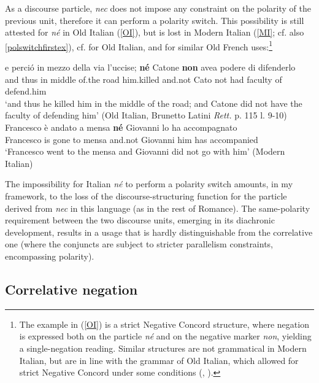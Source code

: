 \documentclass[output=paper,modfonts,nonflat,citecolor=brown,
showindex
]{langsci/langscibook}
\begin{document}
\noindent As a discourse particle, {\em{nec}} does not impose any constraint on the polarity of the previous unit, therefore it can perform a polarity switch. This possibility is still attested for {\em{n\'e}} in Old Italian (\ref{OI}), but is lost in Modern Italian (\ref{MI}; cf. also \ref{polswitchfirstex}), cf. \citet{Zanuttini10} for Old Italian, and \citet[]{Doetjes05} for similar Old French uses:{\footnote{The example in (\ref{OI}) is a strict Negative Concord structure, where negation is expressed both on the particle {\em{n\'e}} and on the negative marker {\em{non}}, yielding a single-negation reading. Similar structures are not grammatical in Modern Italian, but are in line with the grammar of Old Italian, which allowed for strict Negative Concord under some conditions (\citealt[]{Garzonio18}, \citealt[chapter 5]{Gianollo18}).}} 

{\begin{exe}
\ex
\begin{xlist}
\ex \label{OI} \gll e perci\'o in mezzo della via l'uccise; {\bf{n\'e}} Catone {\bf{non}} avea podere di difenderlo\\
and thus in middle of.the road him.killed and.not Cato not had faculty of defend.him\\

`and thus he killed him in the middle of the road; and Catone did not have the faculty of defending him' (Old Italian, Brunetto Latini {\em{Rett.}} p. 115 l. 9-10) 
\ex \label{MI} \gll *Francesco \`e andato a mensa {\bf{n\'e}} Giovanni lo ha accompagnato\\
Francesco is gone to mensa and.not Giovanni him has accompanied\\

`Francesco went to the mensa and Giovanni did not go with him' (Modern Italian)
\end{xlist}
\end{exe}}

\noindent The impossibility for Italian {\em{n\'e}} to perform a polarity switch amounts, in my framework, to the loss of the discourse-structuring function for the particle derived from {\em{nec}} in this language (as in the rest of Romance). The same-polarity requirement between the two discourse units, emerging in its diachronic development, results in a usage that is hardly distinguishable from the correlative one (where the conjuncts are subject to stricter parallelism constraints, encompassing polarity).  

\subsection{Correlative negation} \label{functioncorrelativeneg}
\end{document}
